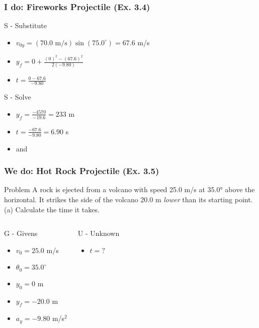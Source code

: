\documentclass{beamer}
\begin{document}
\begin{frame}
\frametitle{I do: Fireworks Projectile (Ex. 3.4)}

\begin{block}{S - Substitute}
\begin{itemize}
\item $v_{0y} = (70.0 \text{ m/s})\sin(75.0^\circ) = 67.6$ m/s
\item $y_f = 0 + \frac{(0)^2 - (67.6)^2}{2(-9.80)}$
\item $t = \frac{0 - 67.6}{-9.80}$
\end{itemize}
\end{block}
\pause
\begin{block}{S - Solve}
\begin{itemize}
\item $y_f = \frac{-4570}{-19.6} = 233$ m
\item $t = \frac{-67.6}{-9.80} = 6.90$ s
\item {} and 
\end{itemize}
\end{block}
\end{frame}

\begin{frame}
\frametitle{We do: Hot Rock Projectile (Ex. 3.5)}
\begin{block}{Problem}
A rock is ejected from a volcano with speed 25.0 m/s at 35.0° above the horizontal. It strikes the side of the volcano 20.0 m \textit{lower} than its starting point. (a) Calculate the time it takes.
\end{block}
\pause
\begin{columns}[T]
\begin{block}{G - Givens}
\begin{itemize}
\item $v_0 = 25.0$ m/s
\item $\theta_0 = 35.0^\circ$
\item $y_0 = 0$ m
\item $y_f = -20.0$ m
\item $a_y = -9.80$ m/s$^2$
\end{itemize}
\end{block}
\pause
{}
\begin{block}{U - Unknown}
\begin{itemize}
\item $t = ?$
\end{itemize}
\end{block}
\end{columns}
\end{frame}
\end{document}
